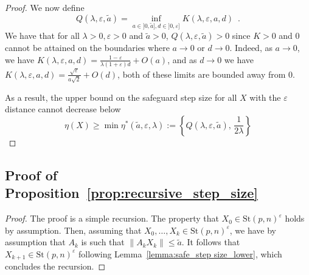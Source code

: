 \documentclass[twoside,11pt]{article}
\newcommand{\stiefel}{{\mathrm{St}(p, n)}}
\newcommand{\finalrevision}[1]{{#1}}
\begin{document}
\begin{proof}
\finalrevision{
We now define 
$$
Q(\lambda, \varepsilon, \tilde{a}) = \inf_{a\in]0, \tilde{a}], d\in ]0, \varepsilon]}K(\lambda, \varepsilon, a, d)\enspace.
$$
We have that for all $\lambda >0, \varepsilon>0$ and $\tilde{a}>0$,  $Q(\lambda,\varepsilon, \tilde{a})>0$ since $K>0$ and $0$ cannot be attained on the boundaries where $a\to 0$ or $d\to 0$. Indeed, as $a\to 0$, we have $K(\lambda, \varepsilon, a, d) = \frac{1-\varepsilon}{\lambda(1+\varepsilon)d} + O(a)$, and as $d\to 0$ we have $K(\lambda, \varepsilon, a, d) = \frac{\sqrt{\varepsilon}}{a\sqrt{2}} + O(d)$, both of these limits are bounded away from 0.
} 
%
%
%
%
%

    As a result, the upper bound on the safeguard step size for all $X$ with the $\varepsilon$ distance cannot decrease below
    \begin{equation*}
        \eta(X) \geq \min \eta^*(\tilde{a}, \varepsilon, \lambda) := \left\{Q(\lambda, \varepsilon, \tilde{a}),\, \frac{1}{2\lambda}\right\}
    \end{equation*}
\end{proof}

\subsection{Proof of Proposition~\ref{prop:recursive_step_size}}
\begin{proof}
    The proof is a simple recursion. The property that $X_0\in\stiefel^\varepsilon$ holds by assumption. Then, assuming that $X_0, \dots, X_k\in\stiefel^\varepsilon$, we have by assumption that $A_k$ is such that $\|A_kX_k\|\leq \tilde{a}$. It follows that $X_{k+1}\in\stiefel^\varepsilon$ following Lemma~\ref{lemma:safe_step size_lower}, which concludes the recursion.
\end{proof}
\end{document}
